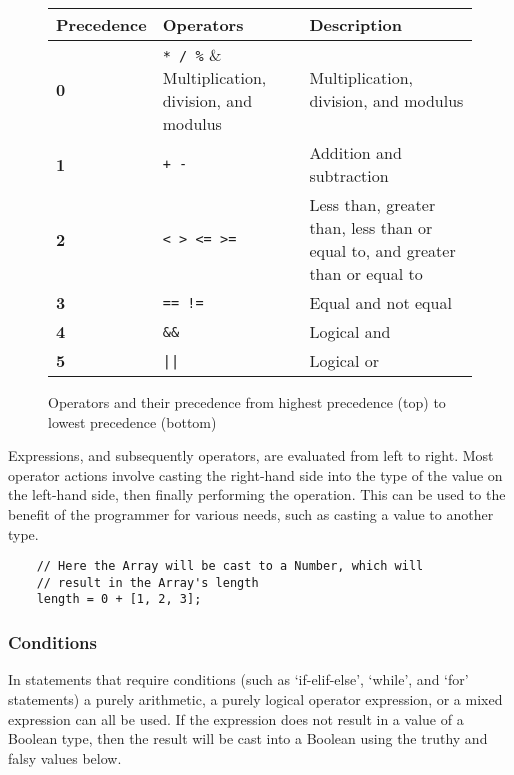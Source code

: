 \begin{figure}[H]
    \begin{center}
        \begin{tabular}{| m{2cm} | m{2cm} | m{5cm} |}
            \hline
            Precedence & Operators & Description\\
            \hline
            \textbf{0} & \verb|* / %| & Multiplication, division, and modulus\\
            \hline
            \textbf{1} & \verb|+ -| & Addition and subtraction\\
            \hline
            \textbf{2} & \verb|< > <= >=| & Less than, greater than, less than or equal to, and greater than or equal to\\
            \hline
            \textbf{3} & \verb|== !=| & Equal and not equal\\
            \hline
            \textbf{4} & \verb|&&| & Logical and\\
            \hline
            \textbf{5} & \verb+||+ & Logical or\\
            \hline
        \end{tabular}
    \end{center}
    \caption{Operators and their precedence from highest precedence (top) to lowest precedence (bottom)}
\end{figure}

Expressions, and subsequently operators, are evaluated from left to right. Most operator actions involve casting the right-hand side into the type of the value on the left-hand side, then finally performing the operation. This can be used to the benefit of the programmer for various needs, such as casting a value to another type.

\begin{verbatim}
    // Here the Array will be cast to a Number, which will 
    // result in the Array's length
    length = 0 + [1, 2, 3];
\end{verbatim}

\subsubsection{Conditions}

In statements that require conditions (such as `if-elif-else', `while', and `for' statements) a purely arithmetic, a purely logical operator expression, or a mixed expression can all be used. If the expression does not result in a value of a Boolean type, then the result will be cast into a Boolean using the truthy and falsy values below.

